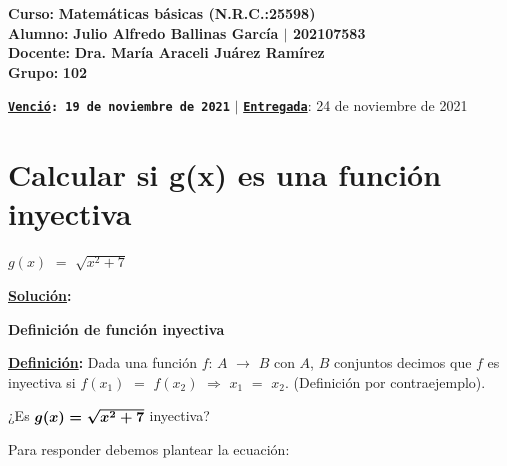 \documentclass[12pt]{article}
\begin{document}
    \large{\bf{\textsf{Curso:}}} {\bfseries{{\textcolor{Bottle Green}{Matemáticas básicas \bfseries{(N.R.C.:25598)}}}}} \\
    \large{\bf{\textsf{Alumno:}}} {\bfseries{{\textcolor{prussianblue}{Julio Alfredo Ballinas García {\large{{$\mid$}}} 202107583}}}}  \\
    \large{\bf{\textsf{Docente:}}} {\bfseries{{\textcolor{Clairvoyant}{Dra. María Araceli Juárez Ramírez}}}}\\
    \large{\bf{\textsf{Grupo:}}} {\bfseries{{\textcolor{Apple Green}{102}}}}\\

\vfill
    
\begin{center} 

        {\small{\texttt{\bfseries {\textcolor{Cinnabar}{{\underline{Venció}}}}: 19 de noviembre de 2021} {\LARGE{ $\mid$ }} {\small{\texttt{\bfseries {\textcolor{Cinnabar}{{\underline{Entregada}}}}}: 24 de noviembre de 2021}}}}
    
\end{center}

\newpage


\section*{{\textsf{Calcular si g(x) es una función inyectiva}}}

\hspace{4cm} {\Large{$g(x)$ $=$ $\sqrt{x^{2}+7}$}}

{\textcolor{Cinnabar}{\underline{\bfseries{Solución}}{\bfseries{:}}}} \vspace{0.5cm}

{\bfseries{Definición de función inyectiva}}


{\textcolor{Tarawera}{\underline{\bfseries{Definición}}{\bfseries{:}}}} Dada una función $f$: $A$ $\longrightarrow$ $B$ con $A$, $B$ conjuntos decimos que $f$ es inyectiva si $f(x_{1})$ $=$ $f(x_{2})$ $\Longrightarrow$ $x_{1}$ $=$ $x_{2}$. (Definición por contraejemplo). \vspace{0.5cm}

¿Es {$\boldsymbol{g(x)$ $=$ $\sqrt{x^{2}+7}}$} inyectiva?  \vspace{0.5cm}

Para responder debemos plantear la ecuación: \vspace{0.5cm}
\end{document}
